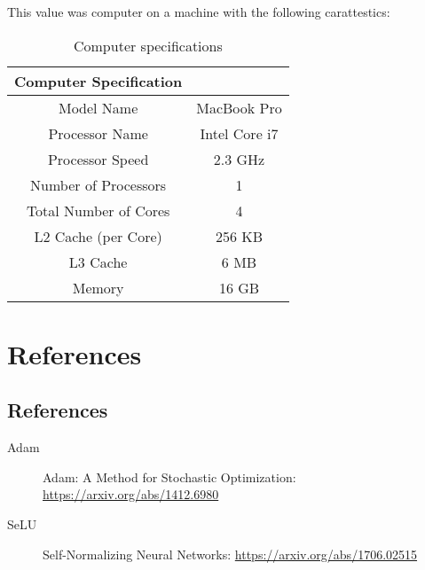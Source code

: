 This value was computer on a machine with the following carattestics:

\begin{table}
	\begin{tabular}{|c|c|}
		\hline
		\textbf{Computer Specification}       \\
		\hline
		Model Name            & MacBook Pro   \\
		\hline
		Processor Name        & Intel Core i7 \\
		\hline
		Processor Speed       & 2.3 GHz       \\
		\hline
		Number of Processors  & 1             \\
		\hline
		Total Number of Cores & 4             \\
		\hline
		L2 Cache (per Core)   & 256 KB        \\
		\hline
		L3 Cache              & 6 MB          \\
		\hline
		Memory                & 16 GB         \\
		\hline
	\end{tabular}
	\caption{Computer specifications}
\end{table}

\part{References}

\chapter{References}

\begin{description}
	\item[Adam] Adam: A Method for Stochastic Optimization: \url{https://arxiv.org/abs/1412.6980} \label{adam}
	\item[SeLU] Self-Normalizing Neural Networks: \url{https://arxiv.org/abs/1706.02515} \label{selu}
\end{description}



